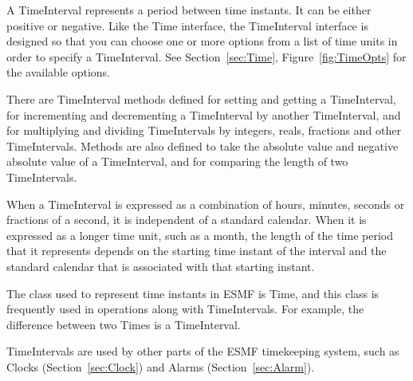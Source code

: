 
A TimeInterval represents a period between time instants.  
It can be either positive or negative.  Like the Time interface, 
the TimeInterval interface is designed so that you can choose 
one or more options from a list of time units in order 
to specify a TimeInterval.  See Section~\ref{sec:Time}, 
Figure~\ref{fig:TimeOpts} for the available options.

There are TimeInterval methods defined for setting and getting 
a TimeInterval, for incrementing and decrementing a TimeInterval 
by another TimeInterval, and for multiplying and dividing 
TimeIntervals by integers, reals, fractions and other TimeIntervals.  
Methods are also defined to take the absolute value and negative 
absolute value of a TimeInterval, and for comparing the length of two
TimeIntervals.

When a TimeInterval is expressed as a combination of hours, 
minutes, seconds or fractions of a second, it is independent of a 
standard calendar.  When it is expressed as a longer time unit,
such as a month, the length of the time period that it represents 
depends on the starting time instant of the interval and the 
standard calendar that is associated with that starting instant.

The class used to represent time instants in ESMF is Time,
and this class is frequently used in operations along with 
TimeIntervals.  For example, the difference between two
Times is a TimeInterval.  

TimeIntervals are used by other parts of the ESMF timekeeping
system, such as Clocks (Section~\ref{sec:Clock}) and Alarms 
(Section~\ref{sec:Alarm}).





